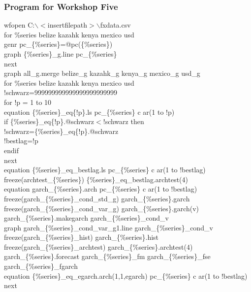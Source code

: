 \documentclass[a4paper,11pt]{article}
\begin{document}
\subsubsection*{Program for Workshop Five}
\noindent wfopen C:$\backslash$$<$insertfilepath$>$$\backslash$fxdata.csv\\
for \%series belize kazahk kenya mexico usd\\
\indent	genr pc\_\{\%series\}=@pc(\{\%series\})\\
\indent	graph \{\%series\}\_g.line pc\_\{\%series\}\\
next\\
graph all\_g.merge belize\_g kazahk\_g kenya\_g mexico\_g usd\_g\\
for \%series belize kazahk kenya mexico usd\\
\indent	!schwarz=999999999999999999999999\\
\indent	for !p = 1 to 10\\
\indent \indent		equation \{\%series\}\_eq\{!p\}.ls pc\_\{\%series\} c ar(1 to !p)\\
\indent \indent		if \{\%series\}\_eq\{!p\}.@schwarz$<$!schwarz then\\
\indent \indent \indent			!schwarz=\{\%series\}\_eq\{!p\}.@schwarz\\
\indent \indent \indent			!bestlag=!p\\
 \indent \indent		endif\\
\indent	next\\
\indent	equation \{\%series\}\_eq\_bestlag.ls pc\_\{\%series\} c ar(1 to !bestlag)\\
\indent	freeze(archtest\_\{\%series\}) \{\%series\}\_eq\_bestlag.archtest(4)\\
\indent	equation garch\_\{\%series\}.arch pc\_\{\%series\} c ar(1 to !bestlag)\\
\indent	freeze(garch\_\{\%series\}\_cond\_std\_g) garch\_\{\%series\}.garch\\
\indent	freeze(garch\_\{\%series\}\_cond\_var\_g) garch\_\{\%series\}.garch(v)\\
\indent	garch\_\{\%series\}.makegarch garch\_\{\%series\}\_cond\_v\\
\indent	graph garch\_\{\%series\}\_cond\_var\_g1.line garch\_\{\%series\}\_cond\_v\\
\indent	freeze(garch\_\{\%series\}\_hist) garch\_\{\%series\}.hist\\
\indent	freeze(garch\_\{\%series\}\_archtest) garch\_\{\%series\}.archtest(4)\\
\indent	garch\_\{\%series\}.forecast garch\_\{\%series\}\_fm garch\_\{\%series\}\_fse garch\_\{\%series\}\_fgarch\\
\indent	equation	\{\%series\}\_eq\_egarch.arch(1,1,egarch) pc\_\{\%series\} c ar(1 to !bestlag)\\
next
\end{document}
